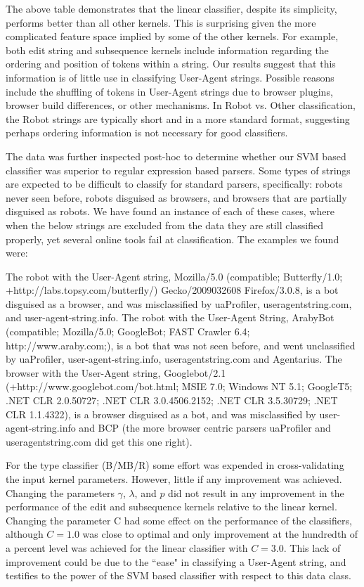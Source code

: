 \documentclass[10pt]{article}
\begin{document}
\begin{multicols}{2}
The above table demonstrates that the linear classifier, despite its simplicity, performs better than all other kernels.  This is surprising given the more complicated feature space implied by some of the other kernels.  For example, both edit string and subsequence kernels include information regarding the ordering and position of tokens within a string.  Our results suggest that this information is of little use in classifying User-Agent strings.  Possible reasons include the shuffling of tokens in User-Agent strings due to browser plugins, browser build differences, or other mechanisms.  In Robot vs. Other classification, the Robot strings are typically short and in a more standard format, suggesting perhaps ordering information is not necessary for good classifiers.  

The data was further inspected post-hoc to determine whether our SVM based classifier was superior to regular expression based parsers.  Some types of strings are expected to be difficult to classify for standard parsers, specifically: robots never seen before, robots disguised as browsers, and browsers that are partially disguised as robots.  We have found an instance of each of these cases, where when the below strings are excluded from the data they are still classified properly, yet several online tools fail at classification.  The examples we found were: 

The robot with the User-Agent string, Mozilla/5.0 (compatible; Butterfly/1.0; \\+http://labs.topsy.com/butterfly/) Gecko/2009032608 Firefox/3.0.8, is a bot disguised as a browser, and was misclassified by uaProfiler, useragentstring.com, and user-agent-string.info. 
The robot with the User-Agent String,  ArabyBot (compatible; Mozilla/5.0; GoogleBot; FAST Crawler 6.4; http://www.araby.com;), is a bot that was not seen before, and went unclassified by uaProfiler, user-agent-string.info, useragentstring.com and Agentarius.  
The browser with the User-Agent string, Googlebot/2.1 (+http://www.googlebot.com/bot.html; MSIE 7.0; Windows NT 5.1; GoogleT5; .NET CLR 2.0.50727; .NET CLR 3.0.4506.2152; .NET CLR 3.5.30729; .NET CLR 1.1.4322), is a browser disguised as a bot, and was misclassified by user-agent-string.info and BCP (the more browser centric parsers uaProfiler and useragentstring.com did get this one right).  

For the type classifier (B/MB/R) some effort was expended in cross-validating the input kernel parameters.  However, little if any improvement was achieved.  Changing the parameters $\gamma$, $\lambda$, and $p$ did not result in any improvement in the performance of the edit and subsequence kernels relative to the linear kernel.  Changing the parameter C had some effect on the performance of the classifiers, although $C = 1.0$ was close to optimal and only improvement at the hundredth of a percent level was achieved for the linear classifier with $C = 3.0$.  This lack of improvement could be due to the ``ease" in classifying a User-Agent string, and testifies to the power of the SVM based classifier with respect to this data class.


\end{multicols}
\end{document}
